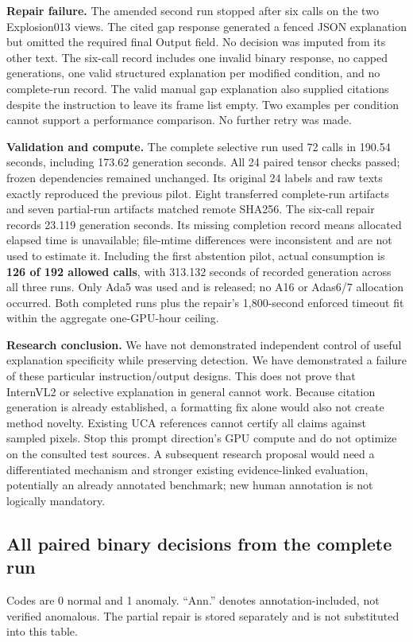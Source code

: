 \textbf{Repair failure.} The amended second run stopped after six calls on the two Explosion013 views. The cited gap response generated a fenced JSON explanation but omitted the required final Output field. No decision was imputed from its other text. The six-call record includes one invalid binary response, no capped generations, one valid structured explanation per modified condition, and no complete-run record. The valid manual gap explanation also supplied citations despite the instruction to leave its frame list empty. Two examples per condition cannot support a performance comparison. No further retry was made.

\textbf{Validation and compute.} The complete selective run used 72 calls in 190.54 seconds, including 173.62 generation seconds. All 24 paired tensor checks passed; frozen dependencies remained unchanged. Its original 24 labels and raw texts exactly reproduced the previous pilot. Eight transferred complete-run artifacts and seven partial-run artifacts matched remote SHA256. The six-call repair records 23.119 generation seconds. Its missing completion record means allocated elapsed time is unavailable; file-mtime differences were inconsistent and are not used to estimate it. Including the first abstention pilot, actual consumption is \textbf{126 of 192 allowed calls}, with 313.132 seconds of recorded generation across all three runs. Only Ada5 was used and is released; no A16 or Adas6/7 allocation occurred. Both completed runs plus the repair's 1,800-second enforced timeout fit within the aggregate one-GPU-hour ceiling.

\textbf{Research conclusion.} We have not demonstrated independent control of useful explanation specificity while preserving detection. We have demonstrated a failure of these particular instruction/output designs. This does not prove that InternVL2 or selective explanation in general cannot work. Because citation generation is already established, a formatting fix alone would also not create method novelty. Existing UCA references cannot certify all claims against sampled pixels. Stop this prompt direction's GPU compute and do not optimize on the consulted test sources. A subsequent research proposal would need a differentiated mechanism and stronger existing evidence-linked evaluation, potentially an already annotated benchmark; new human annotation is not logically mandatory.

\subsection{All paired binary decisions from the complete run}
Codes are 0 normal and 1 anomaly. ``Ann.'' denotes annotation-included, not verified anomalous. The partial repair is stored separately and is not substituted into this table.
\small\normalsize
